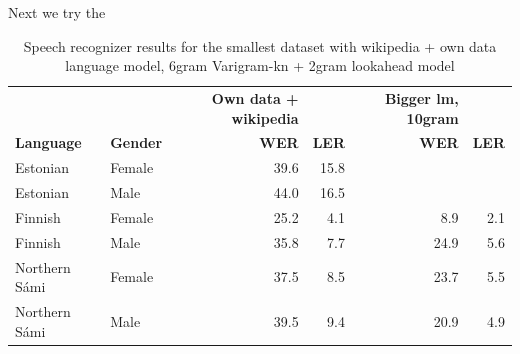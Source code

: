\documentclass[b5paper]{article}
\newcommand{\ns}{{Northern Sámi }}
\begin{document}
Next we try the 

\begin{table}[!h]
\centering
\begin{tabular}{llrrrr}
 & & \textbf{Own data + wikipedia} & & \textbf{Bigger lm, 10gram}\\
\textbf{Language} & \textbf{Gender} & \textbf{WER} & \textbf{LER}& \textbf{{WER}} & \textbf{LER}\\\hline
Estonian & Female & 39.6 & 15.8  &  & \\
Estonian & Male & 44.0 & 16.5& & \\
Finnish & Female & 25.2 &4.1& 8.9 & 2.1  \\
Finnish & Male &  35.8 & 7.7& 24.9 &  5.6 \\
\ns & Female & 37.5 & 8.5 & 23.7  & 5.5 \\
\ns & Male & 39.5 & 9.4& 20.9 & 4.9  \\
\end{tabular}
\caption{Speech recognizer results for the smallest dataset with wikipedia + own data language model, 6gram Varigram-kn + 2gram lookahead model \label{tbl:resultssmallcomp}}
\end{table}


\end{document}
